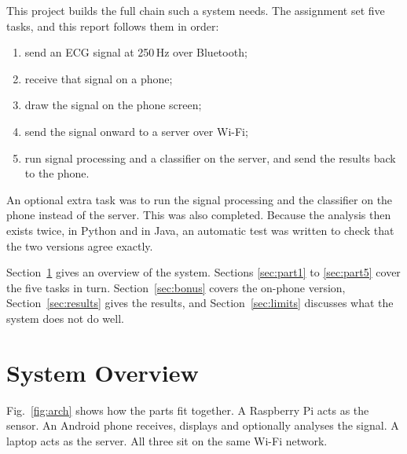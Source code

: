 \documentclass[conference]{IEEEtran}
\begin{document}
This project builds the full chain such a system needs. The assignment set five
tasks, and this report follows them in order:

\begin{enumerate}
\item send an ECG signal at 250\,Hz over Bluetooth;
\item receive that signal on a phone;
\item draw the signal on the phone screen;
\item send the signal onward to a server over Wi-Fi;
\item run signal processing and a classifier on the server, and send the results
      back to the phone.
\end{enumerate}

An optional extra task was to run the signal processing and the classifier on
the phone instead of the server. This was also completed. Because the analysis
then exists twice, in Python and in Java, an automatic test was written to check
that the two versions agree exactly.

Section~\ref{sec:overview} gives an overview of the system. Sections
\ref{sec:part1} to \ref{sec:part5} cover the five tasks in turn.
Section~\ref{sec:bonus} covers the on-phone version, Section~\ref{sec:results}
gives the results, and Section~\ref{sec:limits} discusses what the system does
not do well.

\section{System Overview}
\label{sec:overview}

Fig.~\ref{fig:arch} shows how the parts fit together. A Raspberry Pi acts as the
sensor. An Android phone receives, displays and optionally analyses the signal. A
laptop acts as the server. All three sit on the same Wi-Fi network.
\end{document}

